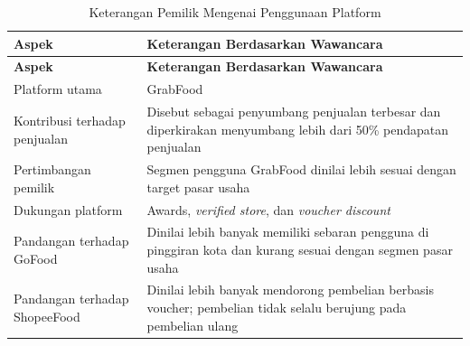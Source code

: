 \begingroup
\begin{xltabular}{\textwidth}{|Z{3.4cm}|Y|}
\caption{Keterangan Pemilik Mengenai Penggunaan Platform}
\label{tab:wawancara_platform} \\
        \toprule
        \textbf{Aspek}                & \textbf{Keterangan Berdasarkan Wawancara}                                                                       \\ \hline
        \midrule
\endfirsthead
{}
        \toprule
        \textbf{Aspek}                & \textbf{Keterangan Berdasarkan Wawancara}                                                                       \\ \hline
        \midrule
\endhead
{}
\endfoot
        \bottomrule
        \endlastfoot
        Platform utama                & GrabFood                                                                                                        \\ \hline
        Kontribusi terhadap penjualan & Disebut sebagai penyumbang penjualan terbesar dan diperkirakan menyumbang lebih dari 50\% pendapatan penjualan  \\ \hline
        Pertimbangan pemilik          & Segmen pengguna GrabFood dinilai lebih sesuai dengan target pasar usaha                                         \\ \hline
        Dukungan platform             & Awards, \textit{verified store}, dan \textit{voucher discount}                                                  \\ \hline
        Pandangan terhadap GoFood     & Dinilai lebih banyak memiliki sebaran pengguna di pinggiran kota dan kurang sesuai dengan segmen pasar usaha    \\ \hline
        Pandangan terhadap ShopeeFood & Dinilai lebih banyak mendorong pembelian berbasis voucher; pembelian tidak selalu berujung pada pembelian ulang \\ \hline
        \bottomrule
    
\end{xltabular}
\endgroup

